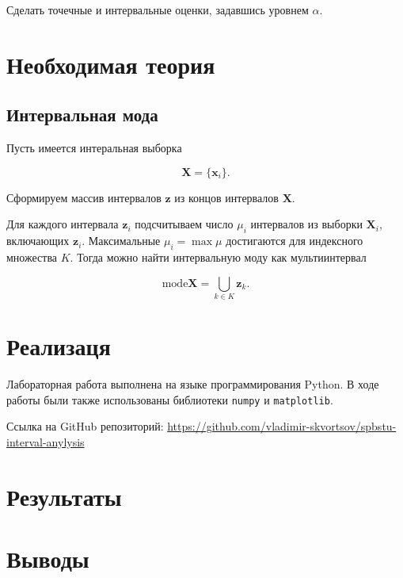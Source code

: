 \documentclass{article}
\begin{document}
  Сделать точечные и интервальные оценки, задавшись уровнем \( \alpha \).

  \section{Необходимая теория}

  \subsection{Интервальная мода}

  Пусть имеется интеральная выборка

  \[
    \mathbf{X} = \{ \mathbf{x}_i \}.
  \]

  Сформируем массив интервалов \( \mathbf{z} \) из концов интервалов
  \( \mathbf{X} \).

  Для каждого интервала \( \mathbf{z}_i \) подсчитываем число \( \mu_i \)
  интервалов из выборки \( \mathbf{X}_i \), включающих \( \mathbf{z}_i \).
  Максимальные \( \mu_i = \max \mu \) достигаются для индексного множества
  \( K \). Тогда можно найти интервальную моду как мультиинтервал

  \begin{equation}
    \text{mode} \mathbf{X} = \bigcup_{k \in K} \mathbf{z}_k.
  \end{equation}

  \section{Реализаця}

  Лабораторная работа выполнена на языке программирования Python. В ходе
  работы были также использованы библиотеки \verb!numpy! и
  \verb!matplotlib!.

  Ссылка на GitHub репозиторий:
  \href{https://github.com/vladimir-skvortsov/spbstu-interval-anylysis}
  {https://github.com/vladimir-skvortsov/spbstu-interval-anylysis}

  \clearpage

  \section{Результаты}

  \section{Выводы}
\end{document}
